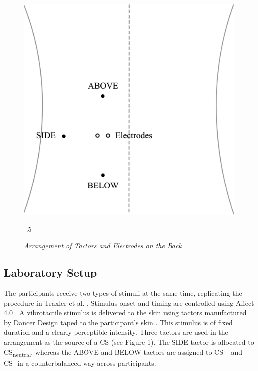 \documentclass[empirical,issue, twocolumn,authordate]{jote-new-article}
\begin{document}
\begin{figure}[t!]
\captionsetup{width=\dimexpr \linewidth+\fullwidthlen\relax}
\begin{fullwidth}
\includegraphics[width=\linewidth]{media/Other,+Figure+1.png}
\end{fullwidth}
\begin{adjustwidth}{-.5\fullwidthlen}{}
\caption{\emph{Arrangement of Tactors and Electrodes on the Back \parencite[][Adapted from]{Traxler2019}}}
\label{fig:fig4}
\end{adjustwidth}
\baselineskip
\end{figure}
\subsection{Laboratory Setup}

The participants receive two types of stimuli at the same time, replicating the procedure in Traxler et al. \parencite{Traxler2019}. Stimulus onset and timing are controlled using Affect 4.0 \parencite{Spruyt2009}. A vibrotactile stimulus is delivered to the skin using tactors manufactured by Dancer Design taped to the participant's skin \parencite{Dancer}. This stimulus is of fixed duration and a clearly perceptible intensity. Three tactors are used in the arrangement as the source of a CS (see Figure 1). The SIDE tactor is allocated to CS\textsubscript{neutral}, whereas the ABOVE and BELOW tactors are assigned to CS+ and CS- in a counterbalanced way across participants.
\end{document}
